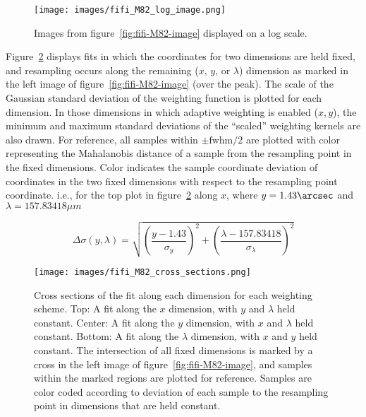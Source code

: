 \begin{figure}[H]
  \begin{center}
  \texttt{[image: images/fifi\_M82\_log\_image.png]}
  \caption{Images from figure~\ref{fig:fifi-M82-image} displayed on a log
           scale.}
  \label{fig:fifi-M82-log-image}
  \end{center}
\end{figure}

\newpage

Figure~\ref{fig:fifi-M82-cross-sections} displays fits in which the coordinates
for two dimensions are held fixed, and resampling occurs along the remaining
($x$, $y$, or $\lambda$) dimension as marked in the left image of
figure~\ref{fig:fifi-M82-image} (over the peak).
The scale of the Gaussian standard deviation of the weighting function is
plotted for each dimension.
In those dimensions in which adaptive weighting is enabled ($x, y$), the
minimum and maximum standard deviations of the ``scaled'' weighting kernels are
also drawn.
For reference, all samples within $\pm \text{fwhm} / 2$ are plotted with color
representing the Mahalanobis distance of a sample from the resampling point
in the fixed dimensions.
Color indicates the sample coordinate deviation of coordinates in the two
fixed dimensions with respect to the resampling point coordinate.
i.e., for the top plot in figure~\ref{fig:fifi-M82-cross-sections} along $x$,
where $y=1.43\arcsec$ and $\lambda=157.83418 \mu m$

\begin{equation}
    \Delta \sigma(y, \lambda) =
        \sqrt{\left( \frac{y - 1.43}{\sigma_y} \right)^2 +
              \left( \frac{\lambda - 157.83418}{\sigma_{\lambda}} \right)^2
        }
    \nonumber \label{eq:equation68}
\end{equation}

\begin{figure}[H]
  \begin{center}
  \texttt{[image: images/fifi\_M82\_cross\_sections.png]}
  \caption{Cross sections of the fit along each dimension for each weighting
           scheme.  Top: A fit along the $x$ dimension, with $y$ and $\lambda$
           held constant.  Center: A fit along the $y$ dimension, with $x$ and
           $\lambda$ held constant.  Bottom: A fit along the $\lambda$
           dimension, with $x$ and $y$ held constant.  The intersection of all
           fixed dimensions is marked by a cross in the left image of
           figure~\ref{fig:fifi-M82-image}, and samples within the marked
           regions are plotted for reference.  Samples are color coded according
           to deviation of each sample to the resampling point in dimensions
           that are held constant.}
  \label{fig:fifi-M82-cross-sections}
  \end{center}
\end{figure}

